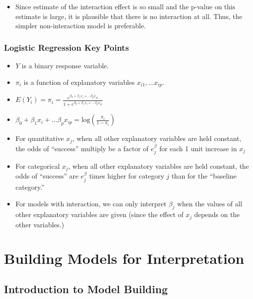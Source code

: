 \documentclass[]{book}
\providecommand{\tightlist}{%
  \setlength{\itemsep}{0pt}\setlength{\parskip}{0pt}}
\begin{document}
\begin{itemize}
\tightlist
\item
  Since estimate of the interaction effect is so small and the p-value
  on this estimate is large, it is plausible that there is no
  interaction at all. Thus, the simpler non-interaction model is
  preferable.
\end{itemize}

\subsection{Logistic Regression Key
Points}\label{logistic-regression-key-points}

\begin{itemize}
\item
  \(Y\) is a binary response variable.
\item
  \(\pi_i\) is a function of explanatory variables
  \(x_{i1}, \ldots x_{ip}\).
\item
  \(E(Y_i) = \pi_i = \frac{e^{\beta_0+\beta_1x_i + \ldots\beta_px_{ip}}}{1+e^{\beta_0+\beta_1x_i + \ldots\beta_px_{ip}}}\)
\item
  \(\beta_0+\beta_1x_i + \ldots\beta_px_{ip} = \text{log}\left(\frac{\pi_i}{1-\pi_i}\right)\)
\item
  For quantitative \(x_j\), when all other explanatory variables are
  held constant, the odds of ``success'' multiply be a factor of
  \(e^\beta_j\) for each 1 unit increase in \(x_j\)
\item
  For categorical \(x_j\), when all other explanatory variables are held
  constant, the odds of ``success'' are \(e^\beta_j\) times higher for
  category \(j\) than for the ``baseline category.''
\item
  For models with interaction, we can only interpret \(\beta_j\) when
  the values of all other explanatory variables are given (since the
  effect of \(x_j\) depends on the other variables.)
\end{itemize}

\chapter{Building Models for
Interpretation}\label{building-models-for-interpretation}

\section{Introduction to Model
Building}\label{introduction-to-model-building}
\end{document}
